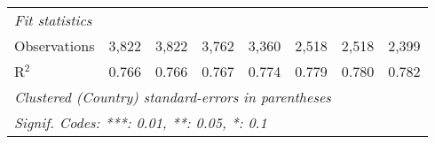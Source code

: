 \begin{tabular}{lccccccc}
   \midrule \emph{Fit statistics}\\
   Observations                                                                & 3,822        & 3,822        & 3,762       & 3,360   & 2,518        & 2,518        & 2,399\\  
   R$^2$                                                                       & 0.766        & 0.766        & 0.767       & 0.774   & 0.779        & 0.780        & 0.782\\  
   \midrule
   \multicolumn{8}{l}{\emph{Clustered (Country) standard-errors in parentheses}}\\
   \multicolumn{8}{l}{\emph{Signif. Codes: ***: 0.01, **: 0.05, *: 0.1}}\\
\end{tabular}
\par\endgroup


